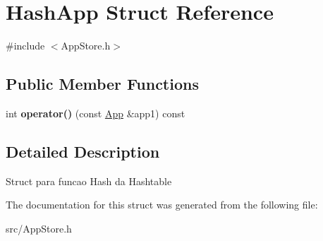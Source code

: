 \hypertarget{struct_hash_app}{\section{Hash\+App Struct Reference}
\label{struct_hash_app}
}


{\ttfamily \#include $<$App\+Store.\+h$>$}

\subsection*{Public Member Functions}
\begin{DoxyCompactItemize}
\item 
\hypertarget{struct_hash_app_aefca8d0194736e5fe05ab000b46f311c}{int {\bfseries operator()} (const \hyperlink{class_app}{App} \&app1) const }\label{struct_hash_app_aefca8d0194736e5fe05ab000b46f311c}

\end{DoxyCompactItemize}


\subsection{Detailed Description}
Struct para funcao Hash da Hashtable 

The documentation for this struct was generated from the following file\+:\begin{DoxyCompactItemize}
\item 
src/App\+Store.\+h\end{DoxyCompactItemize}
